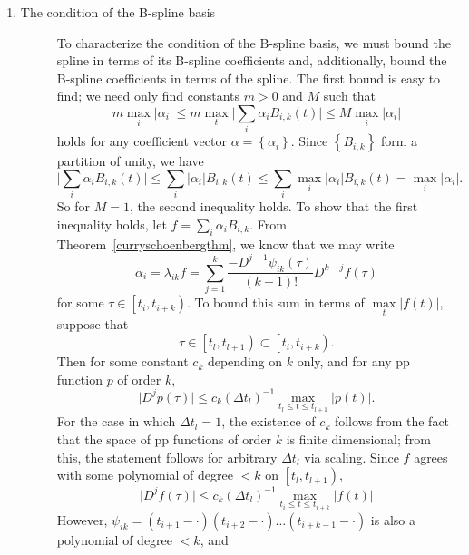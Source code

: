 \documentclass[12pt]{article}
\theoremstyle{definition}
\begin{document}
\begin{enumerate}
\item \label{eq:BS_condition_property} \begin{description}\item[The condition of the B-spline basis]  
To characterize the condition of the B-spline basis, we must bound the spline in terms of its B-spline coefficients and, additionally, bound the B-spline coefficients in terms of the spline. The first bound is easy to find; we need only find constants $m > 0$ and $M$ such that 
\[
m\max \limits_i \vert \alpha_i \vert \le m\max \limits_t \vert \sum_i \alpha_i B_{i,k}\left(t\right)\vert \le M\max \limits_i \vert \alpha_i \vert
\]
holds for any coefficient vector $\alpha = \left\{\alpha_i\right\}$. Since $\left\{B_{i,k} \right\}$ form a partition of unity, we have
\[
\vert \sum_i \alpha_i B_{i,k}\left(t\right)\vert \le \sum_i \vert \alpha_i \vert B_{i,k}\left(t\right) \le \sum_i \max \limits_i \vert \alpha_i \vert B_{i,k}\left(t\right) = \max \limits_i \vert \alpha_i \vert.
\]
So for $M=1$, the second inequality holds. To show that the first inequality holds, let $f = \sum_i \alpha_i B_{i,k}$. From Theorem~\ref{curryschoenbergthm}, we know that we may write
\begin{equation}
\alpha_i = \lambda_{ik}f  = \sum_{j=1}^k \frac{-D^{j-1}\psi_{ik}\left(\tau\right)}{\left(k-1\right)!}D^{k-j}f\left(\tau\right)
\end{equation}
for some $\tau \in \left[t_i, t_{i+k}\right)$. To bound this sum in terms of $\max \limits_t \vert f\left(t\right) \vert$, suppose that 
\[
\tau \in \left[t_l, t_{l+1}\right) \subset \left[t_i, t_{i+k}\right).
\]
Then for some constant $c_k$ depending on $k$ only, and for any pp function $p$ of order $k$, 
\begin{equation} \label{eq:condition_star}
\vert D^j p\left(\tau\right) \vert \le c_k \left(\Delta t_l\right)^{-1}\max \limits_{t_l \le t \le t_{l+1}}\vert p\left(t\right) \vert.
\end{equation}
For the case in which $\Delta t_l =1$, the existence of $c_k$ follows from the fact that the space of pp functions of order $k$ is finite dimensional; from this, the statement follows for arbitrary $\Delta t_l$ via scaling. Since $f$ agrees with some polynomial of degree $< k$ on $\left[t_l,t_{l+1}\right)$,
\begin{equation}\label{eq:condition_starstar}
\vert D^j f\left(\tau\right)\vert \le c_k\left(\Delta t_l\right)^{-1} \max \limits_{t_i \le t \le t_{i+k}} \vert f\left(t\right) \vert 
\end{equation}
However, $\psi_{ik} = \left(t_{i+1}- \cdot\right)\left(t_{i+2}- \cdot\right)\dots \left(t_{i+k-1}- \cdot\right)$ is also a polynomial of degree $< k$, and 

\end{description}
\end{enumerate}
\end{document}
